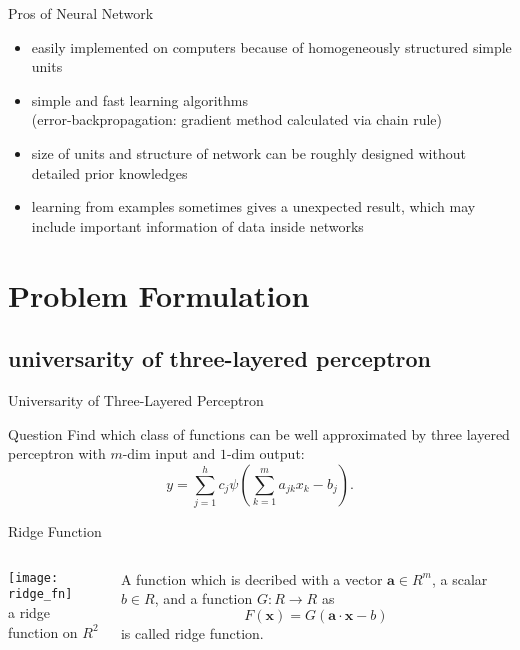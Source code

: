 \documentclass[fleqn,aspectratio=1610]{beamer}
\begin{document}
\begin{frame}[label={sec:orgefb2e11}]{Pros of Neural Network}
\begin{itemize}
\item easily implemented on computers because of
homogeneously structured simple units
\item simple and fast learning algorithms\\[0pt]
(error-backpropagation: gradient method calculated via chain rule)
\item size of units and structure of network can be roughly
designed without detailed prior knowledges
\item learning from examples sometimes gives
a unexpected result, which may include
important information of data inside networks
\end{itemize}
\end{frame}

\section{Problem Formulation}
\label{sec:orgb0eb842}
\subsection{universarity of three-layered perceptron}
\label{sec:orgfdf93b6}
\begin{frame}[label={sec:orgaa495c4}]{Universarity of Three-Layered Perceptron}
\begin{alertblock}{Question}
Find which class of functions can be well approximated by
three layered perceptron with \(m\)-dim input and \(1\)-dim output:
\begin{equation}
  y=\sum_{j=1}^hc_{j}\psi\left(\sum_{k=1}^{m}a_{jk}x_k-b_j\right).
\end{equation}
\end{alertblock}
\end{frame}

\begin{frame}[label={sec:orge28338f}]{Ridge Function}
\begin{columns}
\begin{column}{0.5\columnwidth}
\begin{center}
\texttt{[image: ridge\_fn]}\\[0pt]
a ridge function on \(R^{2}\)
\end{center}
\end{column}

\begin{column}{0.5\columnwidth}
\begin{definition}\label{sec:orga3ac70d}
A function which is decribed with
a vector \(\boldsymbol{a}\in R^{m}\), a scalar \(b\in R\),
and a function \(G:R\to R\) as
\begin{equation}
  F(\boldsymbol{x})=G(\boldsymbol{a}\cdot\boldsymbol{x}-b)
\end{equation}
is called \alert{ridge function}.
\end{definition}
\end{column}
\end{columns}
\end{frame}
\end{document}
